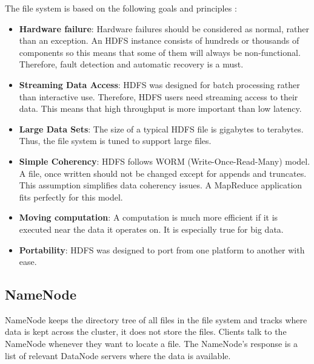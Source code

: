 \noindent The file system is based on the following goals and principles \cite{HDFS-docs}:
\begin{itemize}
	\item \textbf{Hardware failure}: Hardware failures should be considered as normal, rather than an exception. An HDFS instance consists of hundreds or thousands of components so this means that some of them will always be non-functional. Therefore, fault detection and automatic recovery is a must.
	\item \textbf{Streaming Data Access}: HDFS was designed for batch processing rather than interactive use. Therefore, HDFS users need streaming access to their data. This means that high throughput is more important than low latency.
	\item \textbf{Large Data Sets}: The size of a typical HDFS file is gigabytes to terabytes. Thus, the file system is tuned to support large files. 
	\item \textbf{Simple Coherency}: HDFS follows WORM (Write-Once-Read-Many) model. A file, once written should not be changed except for appends and truncates.  This assumption simplifies data coherency issues. A MapReduce application fits perfectly for this model.
	\item \textbf{Moving computation}: A computation is much more efficient if it is executed near the data it operates on. It is especially true for big data. 
	\item \textbf{Portability}: HDFS was designed to port from one platform to another with ease. 
\end{itemize}
\subsection{NameNode}
NameNode keeps the directory tree of all files in the file system and tracks where data is kept across the cluster, it does not store the files. Clients talk to the NameNode whenever they want to locate a file. The NameNode's response is a list of relevant DataNode servers where the data is available. 

